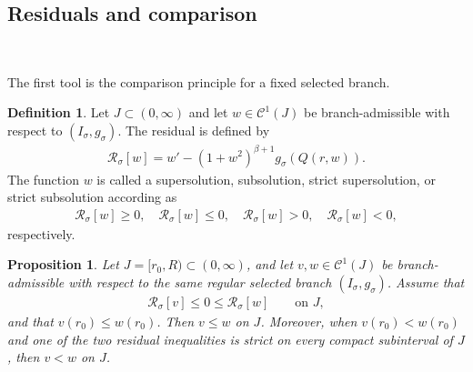 \documentclass{amsart}
\theoremstyle{plain}
\newtheorem{proposition}[theorem]{Proposition}
\theoremstyle{mainintrothm}
\theoremstyle{definition}
\newtheorem{definition}[theorem]{Definition}
\begin{document}
	
	\subsection{Residuals and comparison}\,
	\label{subsec:residuals-comparison}
	
	The first tool is the comparison principle for a fixed selected branch.  
	
	\begin{definition}
		\label{def:residual-barriers}
		Let $J\subset(0,\infty)$ and let $w\in\mathcal C^1(J)$ be
		branch-admissible with respect to $(I_\sigma,g_\sigma)$.  The residual is
		defined by
		\begin{align*}
			\mathcal R_\sigma[w]
			=
			w'
			-
			(1+w^2)^{\beta+1}g_\sigma(Q(r,w)).
		\end{align*}
		The function $w$ is called a supersolution, subsolution, strict supersolution,
		or
		strict subsolution according as
		\begin{align*}
			\mathcal R_\sigma[w]\geq0,
			\quad
			\mathcal R_\sigma[w]\leq0,
			\quad
			\mathcal R_\sigma[w]>0,
			\quad
			\mathcal R_\sigma[w]<0,
		\end{align*}
		respectively.
	\end{definition}
	
	\begin{proposition}
		\label{prop:comparison-principle-ode}
		Let $J=[r_0,R)\subset(0,\infty)$, and let
		$v,w\in\mathcal C^1(J)$ be branch-admissible with respect to the same
		regular selected branch $(I_\sigma,g_\sigma)$.  Assume that
		\begin{align*}
			\mathcal R_\sigma[v]\leq0\leq\mathcal R_\sigma[w]
			\qquad
			\text{on }J,
		\end{align*}
		and that $v(r_0)\leq w(r_0)$.  Then $v\leq w$ on $J$.  Moreover, when $v(r_0)<w(r_0)$ and one of the two
		residual inequalities is strict on
		every compact subinterval of $J$, then $v<w$ on $J$.
	\end{proposition}
	
\end{document}
